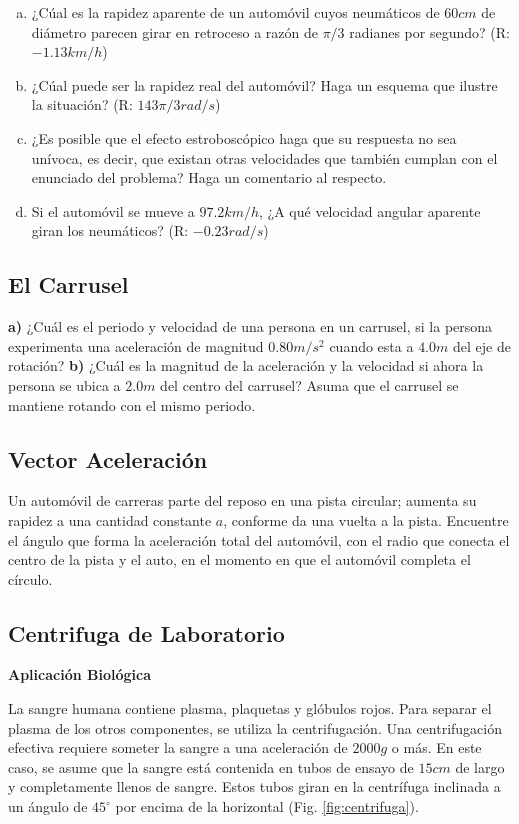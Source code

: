 \documentclass{replab}
\begin{document}
	\begin{enumerate}[a)]
		\item ¿Cúal es la rapidez aparente de un automóvil cuyos neumáticos de $60cm$ de diámetro parecen girar en retroceso a razón de $\pi/3$ radianes por segundo? (R: $-1.13km/h$)
		\item ¿Cúal puede ser la rapidez real del automóvil? Haga un esquema que ilustre la situación? (R: $143\pi/3 rad/s$)
		\item ¿Es posible que el efecto estroboscópico haga que su respuesta no sea unívoca, es decir, que existan otras velocidades que también cumplan con el enunciado del problema? Haga un comentario al respecto.
		\item Si el automóvil se mueve a $97.2km/h$, ¿A qué velocidad angular aparente giran los neumáticos? (R: $-0.23rad/s$)
	\end{enumerate}

\subsection{El Carrusel}
\textbf{a)} ¿Cuál es el periodo y velocidad de una persona en un carrusel, si la persona experimenta una aceleración de magnitud $0.80m/s^2$ cuando esta a $4.0m$ del eje de rotación? \textbf{b)} ¿Cuál es la magnitud de la aceleración y la velocidad si ahora la persona se ubica a $2.0m$ del centro del carrusel? Asuma que el carrusel se mantiene rotando con el mismo periodo.

\subsection{Vector Aceleración}
Un automóvil de carreras parte del reposo en una pista circular; aumenta su rapidez a una cantidad constante $a$, conforme da una vuelta a la pista. Encuentre el ángulo que forma la aceleración total del automóvil, con el radio que conecta el centro de la pista y el auto, en el momento en que el automóvil completa el círculo.

\subsection{Centrifuga de Laboratorio}
\textbf{Aplicación Biológica} 

La sangre humana contiene plasma, plaquetas y glóbulos rojos. Para separar el plasma de los otros componentes, se utiliza la centrifugación. Una centrifugación efectiva requiere someter la sangre a una aceleración de $2000g$ o más. En este caso, se asume que la sangre está contenida en tubos de ensayo de $15cm$ de largo y completamente llenos de sangre. Estos tubos giran en la centrífuga inclinada a un ángulo de $45^\circ$ por encima de la horizontal (Fig. \ref{fig:centrifuga}).
\end{document}
